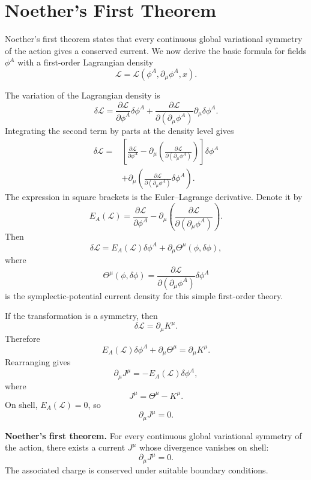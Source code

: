 \section{Noether's First Theorem}

Noether's first theorem states that every continuous global variational symmetry
of the action gives a conserved current. We now derive the basic formula for
fields \(\phi^A\) with a first-order Lagrangian density
\[
    \mathcal{L}=\mathcal{L}(\phi^A,\partial_\mu\phi^A,x).
\]

The variation of the Lagrangian density is
\[
    \delta\mathcal{L}
    =\frac{\partial\mathcal{L}}{\partial\phi^A}\delta\phi^A
    +\frac{\partial\mathcal{L}}{\partial(\partial_\mu\phi^A)}
      \partial_\mu\delta\phi^A.
\]
Integrating the second term by parts at the density level gives
\[
\begin{aligned}
    \delta\mathcal{L}
    ={}&\left[
    \frac{\partial\mathcal{L}}{\partial\phi^A}
    -\partial_\mu\left(
        \frac{\partial\mathcal{L}}{\partial(\partial_\mu\phi^A)}
    \right)\right]\delta\phi^A \\
    &+\partial_\mu\left(
        \frac{\partial\mathcal{L}}{\partial(\partial_\mu\phi^A)}
        \delta\phi^A
    \right).
\end{aligned}
\]
The expression in square brackets is the Euler--Lagrange derivative. Denote it
by
\[
    E_A(\mathcal{L})
    =\frac{\partial\mathcal{L}}{\partial\phi^A}
    -\partial_\mu\left(
        \frac{\partial\mathcal{L}}{\partial(\partial_\mu\phi^A)}
    \right).
\]
Then
\[
    \delta\mathcal{L}
    =E_A(\mathcal{L})\delta\phi^A
    +\partial_\mu\Theta^\mu(\phi,\delta\phi),
\]
where
\[
    \Theta^\mu(\phi,\delta\phi)
    =\frac{\partial\mathcal{L}}{\partial(\partial_\mu\phi^A)}\delta\phi^A
\]
is the symplectic-potential current density for this simple first-order theory.

If the transformation is a symmetry, then
\[
    \delta\mathcal{L}=\partial_\mu K^\mu.
\]
Therefore
\[
    E_A(\mathcal{L})\delta\phi^A
    +\partial_\mu\Theta^\mu
    =\partial_\mu K^\mu.
\]
Rearranging gives
\[
    \partial_\mu J^\mu=-E_A(\mathcal{L})\delta\phi^A,
\]
where
\[
    J^\mu=\Theta^\mu-K^\mu.
\]
On shell, \(E_A(\mathcal{L})=0\), so
\[
    \partial_\mu J^\mu=0.
\]

\begin{theorembox}
\textbf{Noether's first theorem.} For every continuous global variational
symmetry of the action, there exists a current \(J^\mu\) whose divergence
vanishes on shell:
\[
    \partial_\mu J^\mu=0.
\]
The associated charge is conserved under suitable boundary conditions.
\end{theorembox}

